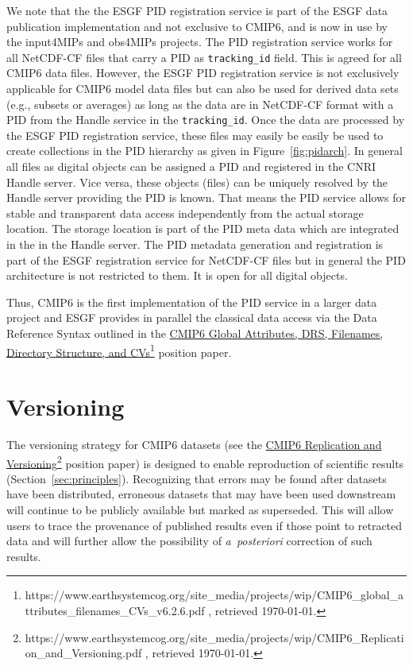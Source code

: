 \documentclass[gmd,manuscript]{copernicus}
\begin{document}
We note that the the ESGF PID registration service is part of the ESGF
data publication implementation and not exclusive to CMIP6, and is now
in use by the input4MIPs and obs4MIPs projects. The PID registration
service works for all NetCDF-CF files that carry a PID as
\texttt{tracking\_id} field. This is agreed for all CMIP6 data files.
However, the ESGF PID registration service is not exclusively
applicable for CMIP6 model data files but can also be used for derived
data sets (e.g., subsets or averages) as long as the data are in
NetCDF-CF format with a PID from the Handle service in the
\texttt{tracking\_id}. Once the data are processed by the ESGF PID
registration service, these files may easily be easily be used to
create collections in the PID hierarchy as given in
Figure~\ref{fig:pidarch}. In general all files as digital objects can
be assigned a PID and registered in the CNRI Handle server. Vice
versa, these objects (files) can be uniquely resolved by the Handle
server providing the PID is known. That means the PID service allows
for stable and transparent data access independently from the actual
storage location. The storage location is part of the PID meta data
which are integrated in the in the Handle server. The PID metadata
generation and registration is part of the ESGF registration service
for NetCDF-CF files but in general the PID architecture is not
restricted to them. It is open for all digital objects.

Thus, CMIP6 is the first implementation of the PID service in a larger
data project and ESGF provides in parallel the classical data access
via the Data Reference Syntax outlined in the
\href{https://www.earthsystemcog.org/site_media/projects/wip/CMIP6_global_attributes_filenames_CVs_v6.2.6.pdf
}{CMIP6 Global Attributes, DRS, Filenames, Directory Structure, and
  CVs}\footnote{https://www.earthsystemcog.org/site\_media/projects/wip/CMIP6\_global\_attributes\_filenames\_CVs\_v6.2.6.pdf
  , retrieved \today.} position paper.

\section{Versioning}
\label{sec:version}

The versioning strategy for CMIP6 datasets (see the
\href{https://www.earthsystemcog.org/site_media/projects/wip/CMIP6_Replication_and_Versioning.pdf
}{CMIP6 Replication and
  Versioning}\footnote{https://www.earthsystemcog.org/site\_media/projects/wip/CMIP6\_Replication\_and\_Versioning.pdf
  , retrieved \today.} position paper) is designed to enable
reproduction of scientific results (Section~\ref{sec:principles}).
Recognizing that errors may be found after datasets have been
distributed, erroneous datasets that may have been used downstream
will continue to be publicly available but marked as superseded. This
will allow users to trace the provenance of published results even if
those point to retracted data and will further allow the possibility
of \emph{a~posteriori} correction of such results.
\end{document}
